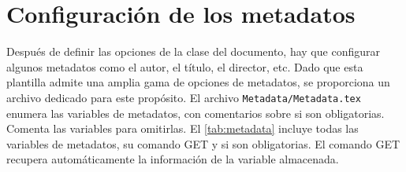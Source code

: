 \section{Configuración de los metadatos}
\label{sec:metadata}

Después de definir las opciones de la clase del documento, hay que configurar algunos metadatos como el autor, el título, el director, etc. Dado que esta plantilla admite una amplia gama de opciones de metadatos, se proporciona un archivo dedicado para este propósito. El archivo \texttt{Metadata/Metadata.tex} enumera las variables de metadatos, con comentarios sobre si son obligatorias. Comenta las variables para omitirlas. El \autoref{tab:metadata} incluye todas las variables de metadatos, su comando GET y si son obligatorias. El comando GET recupera automáticamente la información de la variable almacenada.

